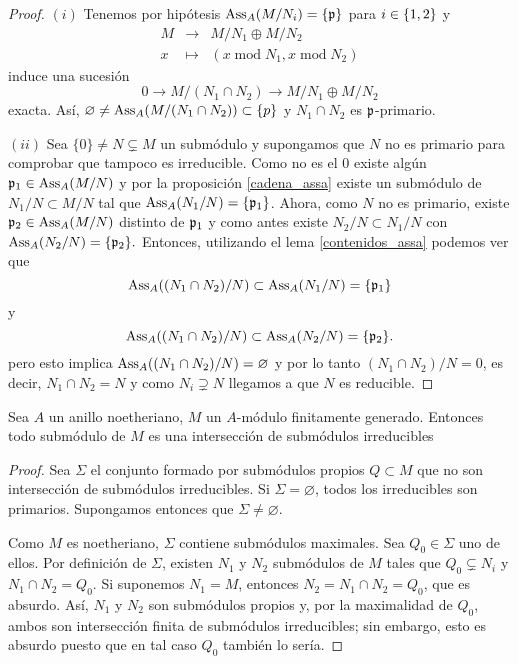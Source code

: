 \documentclass[../main.tex]{subfiles}
\begin{document}
\begin{proof}
$(i)$ Tenemos por hipótesis $\text{Ass}_A(M/N_i)=\{\mathfrak{p}\}$ para $i\in\{1,2\}$ y
$$\begin{array}{rcl}
    M&\longrightarrow& M/N_1\oplus M/N_2\\
    x&\longmapsto&(x\operatorname{mod}  N_1,x\operatorname{mod} N_2)
\end{array}$$
induce una sucesión
$$0\longrightarrow M/(N_1\cap N_2)\longrightarrow M/N_1\oplus M/N_2$$
exacta. Así, $\varnothing\neq \text{Ass}_A(M/(N_1\cap N_2))\subset \{p\}$ y $N_1\cap N_2$ es $\mathfrak{p}$-primario.

$(ii)$ Sea $\{0\}\neq N\subsetneq M$ un submódulo y supongamos que $N$ no es primario para comprobar que tampoco es irreducible. Como no es el 0 existe algún $\mathfrak{p}_1\in\text{Ass}_A(M/N)$ y por la proposición \ref{cadena_assa} existe un submódulo de $N_1 / N \subset M/N$ tal que $\text{Ass}_A(N_1/N)=\{\mathfrak{p}_1\}$.
Ahora, como $N$ no es primario, existe $\mathfrak{p}_2\in\text{Ass}_A(M/N)$ distinto de $\mathfrak{p}_1$ y como antes existe $N_2 / N \subset N_1/N$  con $\text{Ass}_A(N_2/N)=\{\mathfrak{p}_2\}.$
Entonces, utilizando el lema \ref{contenidos_assa} podemos ver que
$$\text{Ass}_A((N_1\cap N_2)/N)\subset\text{Ass}_A(N_1/N)=\{\mathfrak{p}_1\}$$
y
$$\text{Ass}_A((N_1\cap N_2)/N)\subset\text{Ass}_A(N_2/N)=\{\mathfrak{p}_2\}.$$
pero esto implica $\text{Ass}_A((N_1\cap N_2)/N)=\varnothing$ y por lo tanto $(N_1\cap N_2)/N = 0$, es decir, $N_1\cap N_2=N$ y como $N_i\supsetneq N$ llegamos a que $N$ es reducible.
\end{proof}

\begin{lemma}
Sea $A$ un anillo noetheriano, $M$ un $A$-módulo finitamente generado. Entonces todo submódulo de $M$ es una intersección de submódulos irreducibles
\end{lemma}
\begin{proof}
Sea $\Sigma$ el conjunto formado por submódulos propios $Q\subset M$ que no son intersección de submódulos irreducibles. Si $\Sigma=\varnothing$, todos los irreducibles son primarios. Supongamos entonces que $\Sigma\neq\varnothing.$

Como $M$ es noetheriano, $\Sigma$ contiene submódulos maximales. Sea $Q_0\in\Sigma$ uno de ellos. Por definición de $\Sigma$, existen $N_1$ y $N_2$ submódulos de $M$ tales que $Q_0\subsetneq N_i$ y $N_1\cap N_2=Q_0.$ Si suponemos $N_1=M$, entonces $N_2=N_1\cap N_2=Q_0$, que es absurdo. Así, $N_1$ y $N_2$ son submódulos propios y, por la maximalidad de $Q_0$, ambos son intersección finita de submódulos irreducibles; sin embargo, esto es absurdo puesto que en tal caso $Q_0$ también lo sería.
\end{proof}
\end{document}
